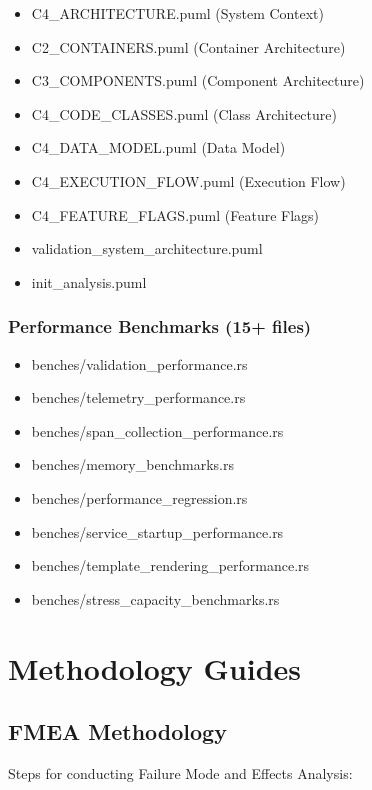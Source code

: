 \documentclass[12pt,twoside,openright]{book}
\theoremstyle{plain}
\theoremstyle{definition}
\theoremstyle{remark}
\begin{document}
\begin{appendices}
\begin{itemize}
  \item C4\_ARCHITECTURE.puml (System Context)
  \item C2\_CONTAINERS.puml (Container Architecture)
  \item C3\_COMPONENTS.puml (Component Architecture)
  \item C4\_CODE\_CLASSES.puml (Class Architecture)
  \item C4\_DATA\_MODEL.puml (Data Model)
  \item C4\_EXECUTION\_FLOW.puml (Execution Flow)
  \item C4\_FEATURE\_FLAGS.puml (Feature Flags)
  \item validation\_system\_architecture.puml
  \item init\_analysis.puml
\end{itemize}

\subsection{Performance Benchmarks (15+ files)}

\begin{itemize}
  \item benches/validation\_performance.rs
  \item benches/telemetry\_performance.rs
  \item benches/span\_collection\_performance.rs
  \item benches/memory\_benchmarks.rs
  \item benches/performance\_regression.rs
  \item benches/service\_startup\_performance.rs
  \item benches/template\_rendering\_performance.rs
  \item benches/stress\_capacity\_benchmarks.rs
\end{itemize}

\chapter{Methodology Guides}

\section{FMEA Methodology}

Steps for conducting Failure Mode and Effects Analysis:


\end{appendices}
\end{document}
